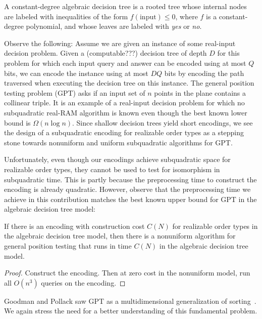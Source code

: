 A constant-degree algebraic decision tree is a rooted tree whose internal nodes are
labeled with inequalities of the form \(f(\text{input}) \leq 0\), where
\(f\) is a constant-degree polynomial,
and whose leaves are labeled with \emph{yes} or \emph{no}.

Observe the following: Assume we are given an instance of some real-input
decision problem. Given a (computable???) decision tree of depth \(D\) for this problem for which
each input query and answer can be encoded using at most \(Q\) bits, we can
encode the instance using at most \(DQ\) bits by encoding the path traversed when
executing the decision tree on this instance. The general position testing
problem (GPT) asks if an input set of \(n\) points in the plane contains a
collinear triple. It is an example of a real-input decision problem for which
no subquadratic real-RAM algorithm is known even though the best known lower
bound is \(\Omega(n \log n)\). Since shallow decision trees yield short encodings,
we see the design of a subquadratic encoding for realizable order types as a
stepping stone towards nonuniform and uniform subquadratic algorithms for
GPT\@.

Unfortunately, even though our encodings achieve subquadratic space for
realizable order types, they cannot be used to test for isomorphism in
subquadratic time. This is partly because the preprocessing time to construct
the encoding is already quadratic.
%
However, observe that the preprocessing time we achieve in this contribution
matches the best known upper bound for GPT in the algebraic decision tree
model:
\begin{theorem}
  If there is an encoding with construction cost \(C(N)\) for
  realizable order types in the algebraic decision tree model, then
  there is a nonuniform algorithm for general position testing that runs
  in time \(C(N)\) in the algebraic decision tree model.
\end{theorem}
%
\begin{proof}
  Construct the encoding. Then at zero cost in the nonuniform
  model, run all \(O(n^3)\) queries on the encoding.
\end{proof}
%
Goodman and Pollack saw GPT as a multidimensional generalization of
sorting~\cite{GP83}.
%
We again stress the need for a better understanding of this fundamental
problem.
